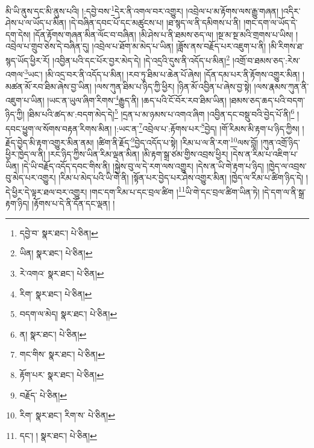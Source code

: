 མི་ཡི་ནུས་དང་མི་ནུས་པའི། །:དབྱེ་བས་\footnote{དབྱེ་བ་  སྣར་ཐང་།  པེ་ཅིན། }དེར་ནི་འགལ་བར་འགྱུར། །འབྲེལ་པ་མ་རྟོགས་ལས་རྒྱུ་གཞན། །འདིར་ཤེས་པ་ལ་ཡོད་པ་མིན། །དེ་བཞིན་དབང་པོ་དང་མཚུངས་པ། །ཐ་སྙད་ལ་ནི་དམིགས་པ་ནི། །གང་དག་ལ་ཡོད་དེ་དག་དེས། །དོན་རྟོགས་གཞན་མིན་ལོང་བ་བཞིན། །མི་ཤེས་པ་ནི་ཐམས་ཅད་ལ། །སྔ་མ་སྔ་མའི་གྲགས་པ་ཡིས། །འབྲེལ་པ་གྲུབ་ཅེས་དེ་བཞིན་དུ། །འབྲེལ་པ་ཐོག་མ་མེད་པ་ཡིན། །ཟློས་ནས་བརྗོད་པར་འཇུག་པ་ནི། །མི་རིགས་ཐ་སྙད་ཡོད་ཕྱིར་རོ། །འབྱིན་པའི་དང་པོར་བྱར་མེད་དེ། །དེ་འདྲའི་དུས་ནི་འདོད་པ་མིན།\footnote{ཡིན།  སྣར་ཐང་།  པེ་ཅིན། } །འགྲོ་བ་ཐམས་ཅད་:རེས་འགལ་\footnote{རེ་འགའ་  སྣར་ཐང་།  པེ་ཅིན། }ཡང་། །མི་འདྲ་བར་ནི་འདོད་པ་མིན། །རབ་ཏུ་ཐིམ་པ་ཆེན་པོ་ཞེས། །དོན་དམ་པར་ནི་རྟོགས་འགྱུར་མིན། །མཚན་མོ་རབ་ཐིམ་ཞེས་བྱ་ཡིན། །ལས་ཀུན་ཐིམ་པ་ཉིད་ཀྱི་ཕྱིར། །ཉིན་མོ་འབྱིན་པ་ཞེས་བྱ་སྟེ། །ལས་རྣམས་ཀུན་ནི་འཇུག་པ་ཡིན། །ཡང་ན་ཡུལ་ཞིག་རིགས་\footnote{རིག་  སྣར་ཐང་།  པེ་ཅིན། }རྒྱུད་ནི། །ཆད་པའི་ངོ་བོར་རབ་ཐིམ་ཡིན། །ཐམས་ཅད་ཆད་པའི་བདག་ཉིད་ཀྱི། །ཐིམ་པའི་ཚད་མ་:བདག་མེད་དེ།\footnote{བདག་ལ་མེད།  སྣར་ཐང་།  པེ་ཅིན། } །དྲན་པ་མ་ཉམས་པ་འགའ་ཞིག །འབྱིན་དང་བསྡུ་བའི་བྱེད་པོ་ནི།\footnote{ན།  སྣར་ཐང་།  པེ་ཅིན། } །དབང་ཕྱུག་ལ་སོགས་བརྟན་རིགས་མིན། །:ཡང་ན་\footnote{གང་གིས་  སྣར་ཐང་།  པེ་ཅིན། }འབྲེལ་པ་:རྟོགས་པར་\footnote{རྟོག་པར་  སྣར་ཐང་།  པེ་ཅིན། }བྱེད། །གོ་རིམས་མི་རྟག་པ་ཉིད་ཀྱིས། །རྗོད་བྱེད་མི་རྟག་འགྱུར་མིན་ནམ། །ཚིག་ནི་རྗོད་\footnote{བརྗོད་  པེ་ཅིན། }བྱེད་འདོད་པ་སྟེ། །རིམ་པ་ལ་ནི་རག་\footnote{རིག་  སྣར་ཐང་། རིག་ས་  པེ་ཅིན། }ལས་བློ། །ཀུན་འགྲོ་ཉིད་ཕྱིར་ཁྱེད་ལ་ནི། །རང་ཉིད་ཀྱིས་ཡིན་རིམ་ལྡན་མིན། །མི་རྟག་སྒྲ་ཙམ་གྱིས་འབྲས་ཕྱིར། །དེས་ན་རིམ་པ་འཇིག་པ་ཡིན། །དེ་ཡི་བརྗོད་འདོད་དབང་གིས་ནི། །སྐྱེས་བུ་ལ་དེ་རག་ལས་འགྱུར། །དེས་ན་ཡི་གེ་རྟག་པ་ཉིད། །ཁྱེད་ལ་འབྲས་བུ་མེད་པར་འགྱུར། །རིམ་པ་མེད་པའི་ཡི་གེ་ནི། །སྟོན་པར་བྱེད་པར་ཤེས་འགྱུར་མིན། །ཁྱེད་ལ་རིམ་པ་ཚིག་ཉིད་དེ། །དེ་ཕྱིར་དེ་ལྟར་ཐལ་བར་འགྱུར། །གང་དག་རིམ་པ་དང་བྲལ་ཚིག །\footnote{དང་། །  སྣར་ཐང་།  པེ་ཅིན། }ཡི་གེ་དང་བྲལ་ཚིག་ཡིན་ཏེ། །དེ་དག་ལ་ནི་སྒྲ་རྟག་ཉིད། །རྟོགས་པ་དེ་ནི་དོན་དང་ལྡན། །
